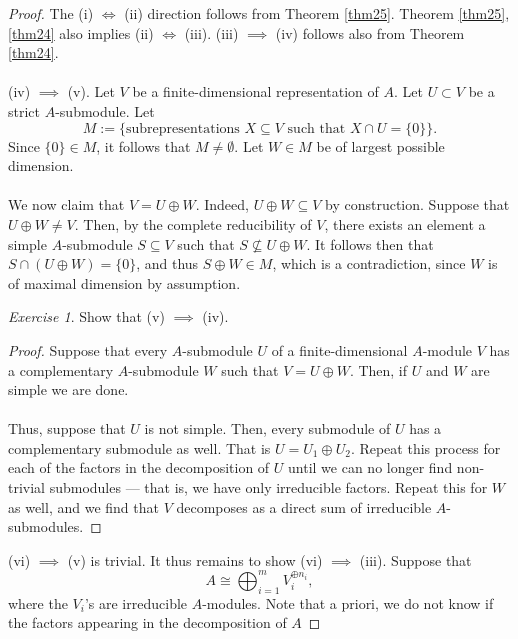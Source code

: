 \documentclass[a4paper]{report}
\theoremstyle{definition}
\theoremstyle{remark}
\theoremstyle{proposition}
\theoremstyle{conjecture}
\theoremstyle{lemma}
\theoremstyle{corollary}
\theoremstyle{exercise}
\newtheorem{exercise}{Exercise}
\theoremstyle{example}
\begin{document}
\begin{proof}
    The (i) $\Longleftrightarrow$ (ii) direction follows from Theorem 
    \ref{thm25}.
    Theorem \ref{thm25}, \ref{thm24} also implies (ii) $\Longleftrightarrow$ 
    (iii).
    (iii) $\implies$ (iv) follows also from Theorem \ref{thm24}.\\\\
    (iv) $\implies$ (v).  Let $V$ be a finite-dimensional representation of 
    $A$. Let $U\subset V$ be a strict $A$-submodule. Let 
    $$M := \lbrace \text{subrepresentations $X\subseteq V$ such that $X\cap U =\lbrace0\rbrace$}\rbrace.$$
    Since $\lbrace 0 \rbrace \in M$, it follows that $M\neq\emptyset$.
    Let $W\in M$ be of largest possible dimension.\\\\
    We now claim that $V=U \oplus W$.
    Indeed, $U\oplus W \subseteq V$ by construction. Suppose that 
    $U\oplus W \neq V$. Then, by the complete reducibility of $V$,
    there exists an element a simple $A$-submodule
    $S\subseteq V$ such that $S \not\subseteq U\oplus W$.
    It follows then that $S \cap (U\oplus W) = \lbrace 0 \rbrace$, and 
    thus $S \oplus W \in M$, which is a contradiction, since $W$ is 
    of maximal dimension by assumption.
    \begin{exercise}
        Show that (v) $\implies$ (iv).
    \end{exercise}
    \begin{proof}
        Suppose that every $A$-submodule $U$ of a finite-dimensional $A$-module 
        $V$ has a complementary $A$-submodule $W$ such that $V = U\oplus W$.
        Then, if $U$ and $W$ are simple we are done. \\\\
        Thus, suppose that 
        $U$ is not simple. Then, every submodule of $U$ has a complementary
        submodule as well. That is $U = U_1 \oplus U_2$. Repeat this
        process for each of the factors in the decomposition of $U$ 
        until we can no longer find non-trivial submodules --- that is,
        we have only irreducible factors. Repeat this for $W$ as well, and 
        we find that $V$ decomposes as a direct sum of irreducible
        $A$-submodules.
    \end{proof}
    (vi) $\implies$ (v) is trivial.
    It thus remains to show (vi) $\implies$ (iii). 
    Suppose that $$A \cong \bigoplus_{i=1}^m V_i^{\oplus n_i},$$
    where the $V_i$'s are irreducible $A$-modules. Note that a priori, we 
    do not know if the factors appearing in the decomposition of $A$ 

\end{proof}
\end{document}
